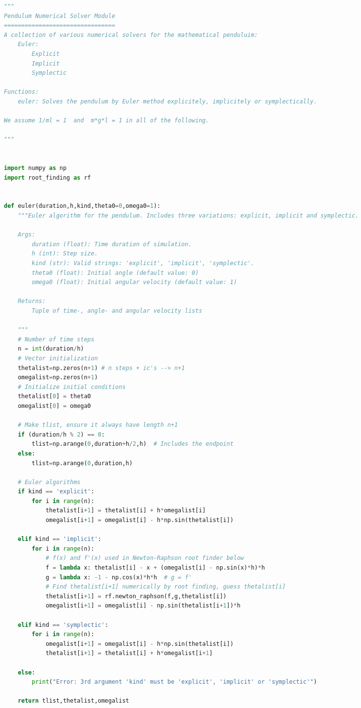 \begin{adjustwidth*}{0cm}{-0.4cm}
\begin{lstlisting}[language=Python]
"""
Pendulum Numerical Solver Module
================================
A collection of various numerical solvers for the mathematical penduluim:
    Euler:
        Explicit
        Implicit
        Symplectic

Functions:
    euler: Solves the pendulum by Euler method explicitely, implicitely or symplectically.

We assume 1/ml = 1  and  m*g*l = 1 in all of the following.

"""


import numpy as np
import root_finding as rf


def euler(duration,h,kind,theta0=0,omega0=1):
    """Euler algorithm for the pendulum. Includes three variations: explicit, implicit and symplectic.

    Args:
        duration (float): Time duration of simulation.
        h (int): Step size.
        kind (str): Valid strings: 'explicit', 'implicit', 'symplectic'.
        theta0 (float): Initial angle (default value: 0)
        omega0 (float): Initial angular velocity (default value: 1)

    Returns:
        Tuple of time-, angle- and angular velocity lists
    
    """
    # Number of time steps
    n = int(duration/h)
    # Vector initialization
    thetalist=np.zeros(n+1) # n steps + ic's --> n+1
    omegalist=np.zeros(n+1)
    # Initialize initial conditions
    thetalist[0] = theta0
    omegalist[0] = omega0

    # Make tlist, ensure it always have length n+1
    if (duration/h % 2) == 0:
        tlist=np.arange(0,duration+h/2,h)  # Includes the endpoint
    else:
        tlist=np.arange(0,duration,h)

    # Euler algorithms
    if kind == 'explicit':
        for i in range(n):
            thetalist[i+1] = thetalist[i] + h*omegalist[i]
            omegalist[i+1] = omegalist[i] - h*np.sin(thetalist[i])

    elif kind == 'implicit':
        for i in range(n):
            # f(x) and f'(x) used in Newton-Raphson root finder below
            f = lambda x: thetalist[i] - x + (omegalist[i] - np.sin(x)*h)*h
            g = lambda x: -1 - np.cos(x)*h*h  # g = f'
            # Find thetalist[i+1] numerically by root finding, guess thetalist[i]
            thetalist[i+1] = rf.newton_raphson(f,g,thetalist[i])
            omegalist[i+1] = omegalist[i] - np.sin(thetalist[i+1])*h
    
    elif kind == 'symplectic':
        for i in range(n):
            omegalist[i+1] = omegalist[i] - h*np.sin(thetalist[i])
            thetalist[i+1] = thetalist[i] + h*omegalist[i+1]
    
    else:
        print("Error: 3rd argument 'kind' must be 'explicit', 'implicit' or 'symplectic'")
    
    return tlist,thetalist,omegalist
\end{lstlisting}
\end{adjustwidth*}